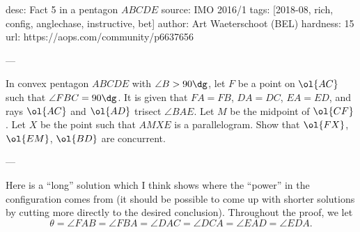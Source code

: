 desc: Fact 5 in a pentagon $ABCDE$
source: IMO 2016/1
tags: [2018-08, rich, config, anglechase, instructive, bet]
author: Art Waeterschoot (BEL)
hardness: 15
url: https://aops.com/community/p6637656

---

In convex pentagon $ABCDE$ with $\angle B > 90\dg$,
let $F$ be a point on $\ol{AC}$ such that $\angle FBC = 90\dg$.
It is given that $FA=FB$, $DA=DC$, $EA=ED$,
and rays $\ol{AC}$ and $\ol{AD}$ trisect $\angle BAE$.
Let $M$ be the midpoint of $\ol{CF}$.
Let $X$ be the point such that $AMXE$ is a parallelogram.
Show that $\ol{FX}$, $\ol{EM}$, $\ol{BD}$ are concurrent.

---

Here is a ``long'' solution which I think
shows where the ``power'' in the configuration comes from
(it should be possible to come up with shorter solutions
by cutting more directly to the desired conclusion).
Throughout the proof, we let
\[ \theta = \angle FAB = \angle FBA = \angle DAC = \angle DCA
  = \angle EAD = \angle EDA. \]

